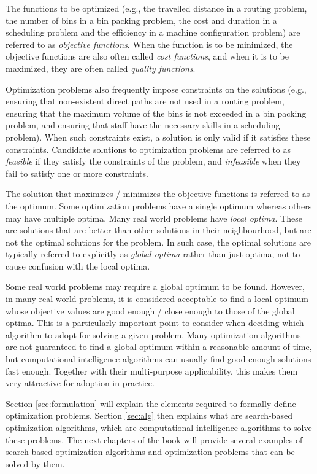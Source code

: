 The functions to be optimized (e.g., the travelled distance in a routing problem, the number of bins in a bin packing problem, the cost and duration in a scheduling problem and the efficiency in a machine configuration problem) are referred to as \textit{objective functions}. When the function is to be minimized, the objective functions are also often called \textit{cost functions}, and when it is to be maximized, they are often called \textit{quality functions}.

Optimization problems also frequently impose constraints on the solutions (e.g., ensuring that non-existent direct paths are not used in a routing problem, ensuring that the maximum volume of the bins is not exceeded in a bin packing problem, and ensuring that staff have the necessary skills in a scheduling problem). When such constraints exist, a solution is only valid if it satisfies these constraints. Candidate solutions to optimization problems are referred to as \textit{feasible} if they satisfy the constraints of the problem, and \textit{infeasible} when they fail to satisfy one or more constraints. 

The solution that maximizes / minimizes the objective functions is referred to as the optimum. Some optimization problems have a single optimum whereas others may have multiple optima. Many real world problems have \textit{local optima}. These are solutions that are better than other solutions in their neighbourhood, but are not the optimal solutions for the problem. In such case, the optimal solutions are typically referred to explicitly as \textit{global optima} rather than just optima, not to cause confusion with the local optima. 

Some real world problems may require a global optimum to be found. However, in many real world problems, it is considered acceptable to find a local optimum whose objective values are good enough / close enough to those of the global optima. This is a particularly important point to consider when deciding which algorithm to adopt for solving a given problem. Many optimization algorithms are not guaranteed to find a global optimum within a reasonable amount of time, but computational intelligence algorithms can usually find good enough solutions fast enough. Together with their multi-purpose applicability, this makes them very attractive for adoption in practice. 

Section \ref{sec:formulation} will explain the elements required to formally define optimization problems. Section \ref{sec:alg} then explains what are search-based optimization algorithms, which are computational intelligence algorithms to solve these problems. The next chapters of the book will provide several examples of search-based optimization algorithms and optimization problems that can be solved by them.

